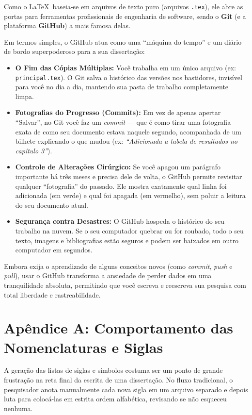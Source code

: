 \documentclass[12pt, a4paper]{article}
\begin{document}
Como o \LaTeX \ baseia-se em arquivos de texto puro (arquivos \texttt{.tex}), ele abre as portas para ferramentas profissionais de engenharia de software, sendo o \textbf{Git} (e a plataforma \textbf{GitHub}) a mais famosa delas. 

Em termos simples, o GitHub atua como uma ``máquina do tempo'' e um diário de bordo superpoderoso para a sua dissertação:

\begin{itemize}
    \item \textbf{O Fim das Cópias Múltiplas:} Você trabalha em um único arquivo (ex: \texttt{principal.tex}). O Git salva o histórico das versões nos bastidores, invisível para você no dia a dia, mantendo sua pasta de trabalho completamente limpa.
    \item \textbf{Fotografias do Progresso (Commits):} Em vez de apenas apertar ``Salvar'', no Git você faz um \textit{commit} — que é como tirar uma fotografia exata de como seu documento estava naquele segundo, acompanhada de um bilhete explicando o que mudou (ex: \textit{``Adicionada a tabela de resultados no capítulo 3''}). 
    \item \textbf{Controle de Alterações Cirúrgico:} Se você apagou um parágrafo importante há três meses e precisa dele de volta, o GitHub permite revisitar qualquer ``fotografia'' do passado. Ele mostra exatamente qual linha foi adicionada (em verde) e qual foi apagada (em vermelho), sem poluir a leitura do seu documento atual.
    \item \textbf{Segurança contra Desastres:} O GitHub hospeda o histórico do seu trabalho na nuvem. Se o seu computador quebrar ou for roubado, todo o seu texto, imagens e bibliografias estão seguros e podem ser baixados em outro computador em segundos.
\end{itemize}

Embora exija o aprendizado de alguns conceitos novos (como \textit{commit}, \textit{push} e \textit{pull}), usar o GitHub transforma a ansiedade de perder dados em uma tranquilidade absoluta, permitindo que você escreva e reescreva sua pesquisa com total liberdade e rastreabilidade.

\section{Apêndice A: Comportamento das Nomenclaturas e Siglas}

A geração das listas de siglas e símbolos costuma ser um ponto de grande frustração na reta final da escrita de uma dissertação. No fluxo tradicional, o pesquisador anota manualmente cada nova sigla em um arquivo separado e depois luta para colocá-las em estrita ordem alfabética, revisando se não esqueceu nenhuma.
\end{document}
